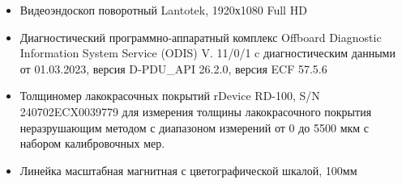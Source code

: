 \begin{itemize}
\item Видеоэндоскоп поворотный Lantotek, 1920х1080 Full HD
\item   Диагностический программно-аппаратный комплекс Offboard Diagnostic Information System Service (ODIS) V. 11/0/1 c диагностическим данными от 01.03.2023, версия  D-PDU\_API 26.2.0, версия ECF 57.5.6 
	\item Толщиномер лакокрасочных покрытий rDevice RD-100, S/N 240702ECX0039779  для измерения толщины лакокрасочного покрытия неразрушающим методом с диапазоном измерений от 0 до 5500 мкм с набором калибровочных мер.
\item   
Линейка масштабная магнитная с цветографической шкалой, 100мм

\end{itemize}
